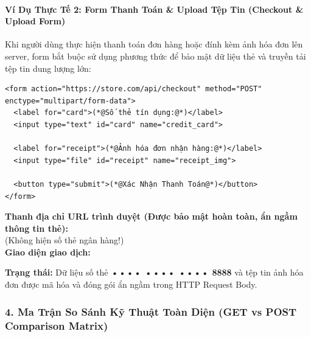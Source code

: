 \paragraph{Ví Dụ Thực Tế 2: Form Thanh Toán \& Upload Tệp Tin (Checkout \& Upload Form)}
Khi người dùng thực hiện thanh toán đơn hàng hoặc đính kèm ảnh hóa đơn lên server, form bắt buộc sử dụng phương thức  để bảo mật dữ liệu thẻ và truyền tải tệp tin dung lượng lớn:

\begin{codeWindowBreakable}
\begin{lstlisting}[language=HTML5]
<form action="https://store.com/api/checkout" method="POST" enctype="multipart/form-data">
  <label for="card">(*@Số thẻ tín dụng:@*)</label>
  <input type="text" id="card" name="credit_card">

  <label for="receipt">(*@Ảnh hóa đơn nhận hàng:@*)</label>
  <input type="file" id="receipt" name="receipt_img">

  <button type="submit">(*@Xác Nhận Thanh Toán@*)</button>
</form>
\end{lstlisting}
\end{codeWindowBreakable}

\begin{browserWindow}
\sffamily\small
\textbf{Thanh địa chỉ URL trình duyệt (Được bảo mật hoàn toàn, ẩn ngầm thông tin thẻ):} \\[3pt]
 \;\textcolor{codeComment}{(Không hiện số thẻ ngân hàng!)} \\[8pt]
\textbf{Giao diện giao dịch:} \\[4pt]
\begin{tcolorbox}[colback=white, colframe=secondaryTeal!20, arc=4pt, boxrule=0.6pt, left=8pt, right=8pt, top=6pt, bottom=6pt]
  \textcolor{darkText}{\textbf{Trạng thái:}} Dữ liệu số thẻ \textbf{•••• •••• •••• 8888} và tệp tin ảnh hóa đơn được mã hóa và đóng gói ẩn ngầm trong HTTP Request Body.
\end{tcolorbox}
\end{browserWindow}

\subsubsection{4. Ma Trận So Sánh Kỹ Thuật Toàn Diện (GET vs POST Comparison Matrix)}

